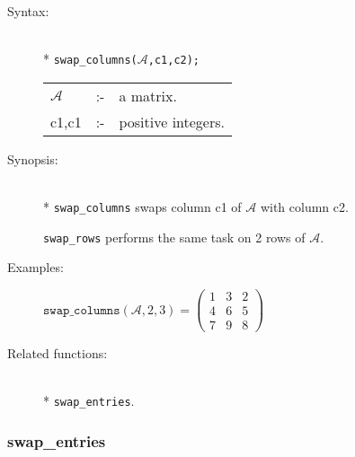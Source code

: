 \begin{description}
\item[Syntax:]\mbox{}\\*
\texttt{swap\_columns($\mathcal{A}$,c1,c2);}\\[2mm]
\begin{tabular}{l l l}
$\mathcal{A}$ &:-& a matrix. \\
c1,c1      &:-& positive integers. 
\end{tabular}

\item[Synopsis:]\mbox{}\\*
\texttt{swap\_columns} swaps column c1 of $\mathcal{A}$ with column c2. 

\texttt{swap\_rows} performs the same task on 2 rows of $\mathcal{A}$.

\item[Examples:]
\begin{flushleft}  
\begin{math}  
\texttt{swap\_columns}(\mathcal{A},2,3) = 
        \begin{pmatrix} 1 & 3 & 2 \\ 4 & 6 & 5 \\ 7 & 9 & 8 \end{pmatrix}
\end{math}  
\end{flushleft}

\item[Related functions:]\mbox{}\\*
\texttt{swap\_entries}.
\end{description}


\subsubsection{swap\_entries}
\label{linalg:swap_entries}

